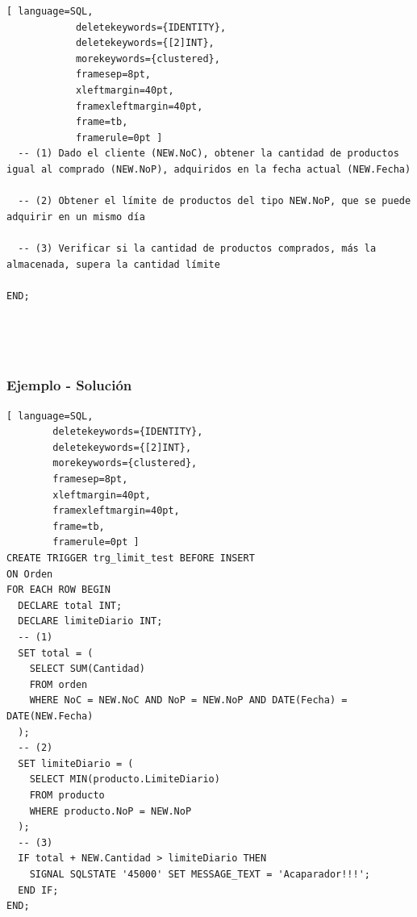 \documentclass[
	10pt, %
	aspectratio=169, %
]{beamer}
\begin{document}
\begin{frame}[fragile]
\begin{onlyenv}
\begin{lstlisting}[ language=SQL,
			deletekeywords={IDENTITY},
			deletekeywords={[2]INT},
			morekeywords={clustered},
			framesep=8pt,
			xleftmargin=40pt,
			framexleftmargin=40pt,
			frame=tb,
			framerule=0pt ]
  -- (1) Dado el cliente (NEW.NoC), obtener la cantidad de productos igual al comprado (NEW.NoP), adquiridos en la fecha actual (NEW.Fecha)
  
  -- (2) Obtener el límite de productos del tipo NEW.NoP, que se puede adquirir en un mismo día
  
  -- (3) Verificar si la cantidad de productos comprados, más la almacenada, supera la cantidad límite

END;
\end{lstlisting}
\end{onlyenv}
		
	\ 
	
	\ 
	
	
	
	
\end{frame}


\begin{frame}[fragile]
	
	\frametitle{Ejemplo - Solución}
	
	\begin{lstlisting}[ language=SQL,
		deletekeywords={IDENTITY},
		deletekeywords={[2]INT},
		morekeywords={clustered},
		framesep=8pt,
		xleftmargin=40pt,
		framexleftmargin=40pt,
		frame=tb,
		framerule=0pt ]
CREATE TRIGGER trg_limit_test BEFORE INSERT 
ON Orden
FOR EACH ROW BEGIN
  DECLARE total INT;
  DECLARE limiteDiario INT;
  -- (1) 
  SET total = (
    SELECT SUM(Cantidad) 
    FROM orden 
    WHERE NoC = NEW.NoC AND NoP = NEW.NoP AND DATE(Fecha) = DATE(NEW.Fecha)
  );
  -- (2)
  SET limiteDiario = (
    SELECT MIN(producto.LimiteDiario) 
    FROM producto 
    WHERE producto.NoP = NEW.NoP
  );
  -- (3)
  IF total + NEW.Cantidad > limiteDiario THEN
    SIGNAL SQLSTATE '45000' SET MESSAGE_TEXT = 'Acaparador!!!';
  END IF;
END;
\end{lstlisting}

\end{frame}

\end{document}

